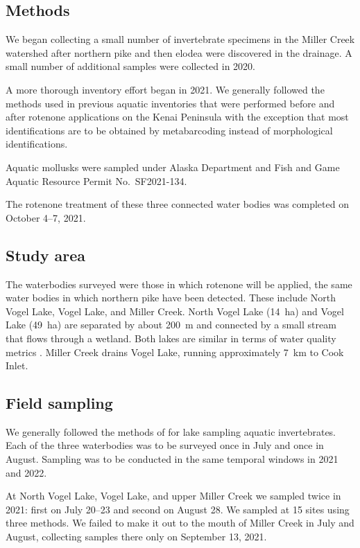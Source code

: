 \begin{multicols}{2}
\section{Methods}

We began collecting a small number of invertebrate specimens in the Miller Creek watershed after northern pike and then elodea were discovered in the drainage. A small number of additional samples were collected in 2020.

A more thorough inventory effort began in 2021. We generally followed the methods used in previous aquatic inventories that were performed before and after rotenone applications on the Kenai Peninsula \citep{Massengill2014, Massengill2017} with the exception that most identifications are to be obtained by metabarcoding instead of morphological identifications.

Aquatic mollusks were sampled under Alaska Department and Fish and Game Aquatic Resource Permit No.\ SF2021-134.

The rotenone treatment of these three connected water bodies was completed on October 4--7, 2021.

\subsection{Study area}

The waterbodies surveyed were those in which rotenone will be applied, the same water bodies in which northern pike have been detected. These include North Vogel Lake, Vogel Lake, and Miller Creek. North Vogel Lake (14~ha) and Vogel Lake (49~ha) are separated by about 200~m and connected by a small stream that flows through a wetland. Both lakes are similar in terms of water quality metrics \citep{Meyer2021}. Miller Creek drains Vogel Lake, running approximately 7~km to Cook Inlet.

\subsection{Field sampling}

We generally followed the methods of \citet{Massengill2014, Massengill2017} for lake sampling aquatic invertebrates. Each of the three waterbodies was to be surveyed once in July and once in August. Sampling was to be conducted in the same temporal windows in 2021 and 2022.

At North Vogel Lake, Vogel Lake, and upper Miller Creek we sampled twice in 2021: first on July 20--23 and second on August 28. We sampled at 15 sites using three methods. We failed to make it out to the mouth of Miller Creek in July and August, collecting samples there only on September 13, 2021. 


\end{multicols}

